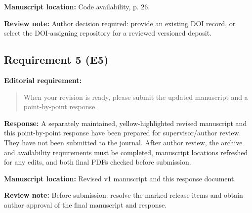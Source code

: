 \documentclass[11pt,a4paper]{article}
\newcommand{\reviewnote}[1]{\par\noindent\colorbox{yellow!25}{\parbox{\dimexpr\linewidth-2\fboxsep\relax}{\small\textbf{Review note:} #1}}\par}
\begin{document}
\textbf{Manuscript location:} Code availability, p. 26.
\reviewnote{Author decision required: provide an existing DOI record, or select the DOI-assigning repository for a reviewed versioned deposit.}
\begin{samepage}
\subsection*{Requirement 5 (E5)}
\textbf{Editorial requirement:}
\begin{quote}\small When your revision is ready, please submit the updated manuscript and a point-by-point response.\end{quote}
\end{samepage}
\textbf{Response:}
A separately maintained, yellow-highlighted revised manuscript and this point-by-point response have been prepared for supervisor/author review. They have not been submitted to the journal. After author review, the archive and availability requirements must be completed, manuscript locations refreshed for any edits, and both final PDFs checked before submission.

\textbf{Manuscript location:} Revised v1 manuscript and this response document.
\reviewnote{Before submission: resolve the marked release items and obtain author approval of the final manuscript and response.}
\end{document}
